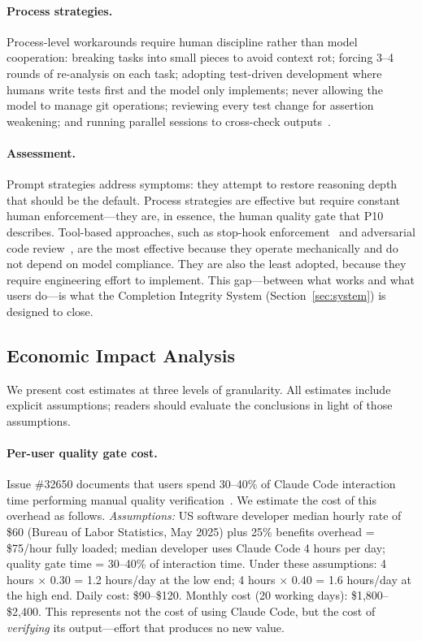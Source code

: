 \paragraph{Process strategies.}
Process-level workarounds require human discipline rather than model cooperation: breaking tasks into small pieces to avoid context rot; forcing 3--4 rounds of re-analysis on each task; adopting test-driven development where humans write tests first and the model only implements; never allowing the model to manage git operations; reviewing every test change for assertion weakening; and running parallel sessions to cross-check outputs~\cite{dolthub2025gotchas}.

\paragraph{Assessment.}
Prompt strategies address symptoms: they attempt to restore reasoning depth that should be the default.
Process strategies are effective but require constant human enforcement---they are, in essence, the human quality gate that P10 describes.
Tool-based approaches, such as stop-hook enforcement~\cite{laurenzo2026amd} and adversarial code review~\cite{adversarialreviewer}, are the most effective because they operate mechanically and do not depend on model compliance.
They are also the least adopted, because they require engineering effort to implement.
This gap---between what works and what users do---is what the Completion Integrity System (Section~\ref{sec:system}) is designed to close.


\subsection{Economic Impact Analysis}
\label{sec:economic}

We present cost estimates at three levels of granularity.
All estimates include explicit assumptions; readers should evaluate the conclusions in light of those assumptions.

\paragraph{Per-user quality gate cost.}
Issue \#32650 documents that users spend 30--40\% of Claude Code interaction time performing manual quality verification~\cite{ghissue32650}.
We estimate the cost of this overhead as follows.
\emph{Assumptions:} US software developer median hourly rate of \$60 (Bureau of Labor Statistics, May 2025) plus 25\% benefits overhead = \$75/hour fully loaded; median developer uses Claude Code 4 hours per day; quality gate time = 30--40\% of interaction time.
Under these assumptions: 4 hours $\times$ 0.30 = 1.2 hours/day at the low end; 4 hours $\times$ 0.40 = 1.6 hours/day at the high end.
Daily cost: \$90--\$120.
Monthly cost (20 working days): \$1,800--\$2,400.
This represents not the cost of using Claude Code, but the cost of \emph{verifying} its output---effort that produces no new value.

